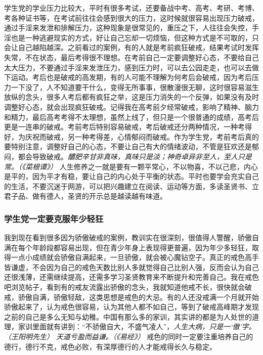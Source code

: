 学生党的学业压力比较大，平时有很多考试，还要备战中考、高考、考研、考博、考各种证书等，在考试前往往会感到很大的压力，这时候就很容易出现压力破戒，通过手淫来发泄和排解压力，这种现象是很常见的，重压之下，人往往会失控，手淫也是一种逃避现实的方式，好让自己忘却一切烦恼，但这种方式是不可取的，只会让自己越陷越深。之前看过的案例，有的人就是考前疯狂破戒，结果考试时发挥失常，不在状态，最后考得很不理想。在考前自己一定要调整好心态，不要给自己太大压力，不要通过手淫来发泄压力，感到压力时，可以去公园走走，也可以去做下运动。考后也是破戒的高发期，有的人可能不理解为何考后会破戒，因为考后压力一下没了，人不知道要干什么，变得无所事事，很散漫很无聊，这时很容易滋生放纵的念头，很多人考后都有疯狂之举，这是压力消失的一个反弹，如果没有及时调整好心态，就会出现疯狂破戒。记得我在高考前夕经常破戒，影响了精神、脑力和精力，最后高考考得不太理想，虽然上线了，但只是一个很普通的成绩，高考后更是一连串的破戒。考前考后特别容易破戒，考后破戒还分两种情况，一种考得好，为庆祝而破戒，另一种考得差，心情郁闷而破戒。作为学生党，考前考后真的要特别注意，调整好自己的心态，不要让自己有大的情绪波动，不管是狂欢还是郁闷，都会导致破戒。\textit{醲肥辛甘非真味，真味只是淡；神奇卓异非至人，至人只是常。（《菜根谭》）} 人生修养之一就是要有一颗平常心，不以物喜，不以己悲，内心是平的，因为平才有稳，要让自己的内心处于平衡的状态。平时也要学会充实自己的生活，不要沉迷于网游，可以把兴趣建立在阅读、运动等方面，多读圣贤书、立君子品、做有德人，圣贤的开示总是越读越有味道。

\subsubsection{学生党一定要克服年少轻狂}

我到现在看到很多因为骄傲破戒的案例，教训实在很深刻，很值得人警醒，骄傲自满在每个年龄段都容易出现，但在青少年身上表现得更普遍，因为年少多轻狂，取得一点小成绩就会骄傲自满起来，一旦骄傲，就会被心魔钻空子。真正的戒色高手皆谦虚，不会因为自己的戒色天数比别人多就觉得自己比别人强，反而会认为自己还很浅薄，还需继续提高，还需多学习圣贤教育来不断提升和完善自己。我在戒色吧浏览帖子，看到有的戒友流露出骄傲的念头，我就知道他戒不长，很快就会破戒，骄傲自满，骄傲轻敌，这类思想是戒色的大忌。有的人还没戒满一个月就开始骄傲起来了，认为戒色很容易，认为其他人都不如自己，等到了破戒高峰期才发现之前的自己是多么无知与幼稚。中国有那么多的家训，其实讲的都是为人处世的道理，家训里面就有讲到：“不骄傲自大，不盛气凌人”，\textit{人生大病，只是一‘傲’字。（王阳明先生）} \textit{天道亏盈而益谦。（《易经》）} 戒色的同时一定要注重培养自己的德行，德行不克，戒色必败，有深厚德行的人才能戒得长久与稳定。

